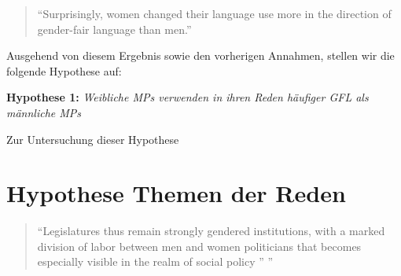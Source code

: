 \documentclass[12pt, 
    twoside=false, 
    bibliography=totoc, 
    numbers=endperiod, 
    headings=normal, 
    toc=chapterentrydotfill
    ]{scrbook}
\begin{document}
\citereset
\begin{quote}
    \enquote {Surprisingly, women changed their language use more in the direction of gender-fair language than men.} \parencite[555]{koeser_2014}
\end{quote}


Ausgehend von diesem Ergebnis sowie den vorherigen Annahmen, stellen wir die folgende Hypothese auf: 

\textbf{Hypothese 1:} \emph{Weibliche MPs verwenden in ihren Reden häufiger GFL als männliche MPs}

Zur Untersuchung dieser Hypothese 



\section{Hypothese Themen der Reden}\label{kapitel:hypothese2}

\begin{quote}
    \enquote{Legislatures thus remain strongly gendered institutions, with a marked division of labor between men and women politicians that becomes especially visible in the realm of social policy ” \parencite[250]{ennser-jedenastik_2017}}
\end{quote}
\end{document}
